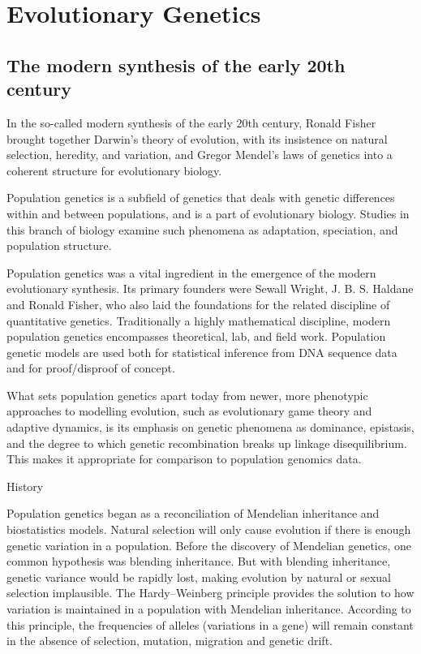\chapter{Evolutionary Genetics}\label{evolutionary-genetics}

\hypertarget{the-modern-synthesis-of-the-early-20th-century}{%
\section{The modern synthesis of the early 20th century}\label{the-modern-synthesis-of-the-early-20th-century}}

In the so-called modern synthesis of the early 20th century, Ronald Fisher brought together Darwin's theory of evolution, with its insistence on natural selection, heredity, and variation, and Gregor Mendel's laws of genetics into a coherent structure for evolutionary biology.

Population genetics is a subfield of genetics that deals with genetic differences within and between populations, and is a part of evolutionary biology. Studies in this branch of biology examine such phenomena as adaptation, speciation, and population structure.

Population genetics was a vital ingredient in the emergence of the modern evolutionary synthesis. Its primary founders were Sewall Wright, J. B. S. Haldane and Ronald Fisher, who also laid the foundations for the related discipline of quantitative genetics. Traditionally a highly mathematical discipline, modern population genetics encompasses theoretical, lab, and field work. Population genetic models are used both for statistical inference from DNA sequence data and for proof/disproof of concept.

What sets population genetics apart today from newer, more phenotypic approaches to modelling evolution, such as evolutionary game theory and adaptive dynamics, is its emphasis on genetic phenomena as dominance, epistasis, and the degree to which genetic recombination breaks up linkage disequilibrium. This makes it appropriate for comparison to population genomics data.

History

Population genetics began as a reconciliation of Mendelian inheritance and biostatistics models. Natural selection will only cause evolution if there is enough genetic variation in a population. Before the discovery of Mendelian genetics, one common hypothesis was blending inheritance. But with blending inheritance, genetic variance would be rapidly lost, making evolution by natural or sexual selection implausible. The Hardy--Weinberg principle provides the solution to how variation is maintained in a population with Mendelian inheritance. According to this principle, the frequencies of alleles (variations in a gene) will remain constant in the absence of selection, mutation, migration and genetic drift.

